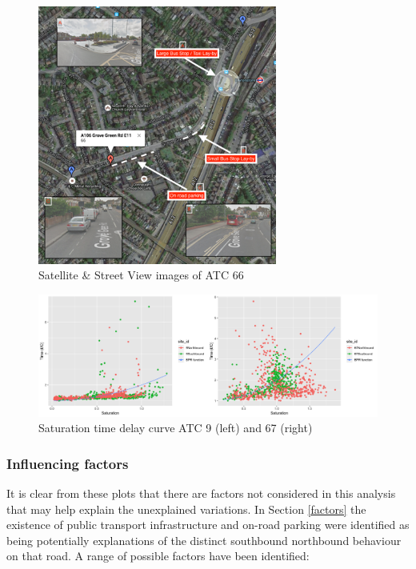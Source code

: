 \documentclass{CUP-JNL-DCE}
\begin{document}
\begin{figure}[htbp!] 
	\centering    
	\includegraphics[width=0.7\textwidth]{Picture29}
	\caption[Satellite \& Street View images of ATC 66 \citep{google_maps}]{Satellite \& Street View images of ATC 66 \citep{google_maps}}
	\label{fig:Picture3.29}
\end{figure}

\begin{figure}[htbp!] 
	\centering    
	\includegraphics[width=1.0\textwidth]{Picture30}
	\caption[Saturation time delay curve ATC 9 (left) and 67 (right)]{Saturation time delay curve ATC 9 (left) and 67 (right)}
	\label{fig:Picture3.30}
\end{figure}

\subsubsection{Influencing factors}\label{other_factors}

It is clear from these plots that there are factors not considered in this analysis that may help explain the unexplained variations. In Section \ref{factors} the existence of public transport infrastructure and on-road parking were identified as being potentially explanations of the distinct southbound northbound behaviour on that road. A range of possible factors have been identified:
\end{document}
